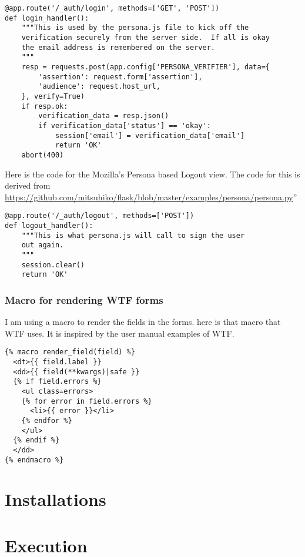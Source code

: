 \documentclass[11pt]{article}
\begin{document}
\begin{itemize}
\begin{verbatim}
@app.route('/_auth/login', methods=['GET', 'POST'])
def login_handler():
    """This is used by the persona.js file to kick off the
    verification securely from the server side.  If all is okay
    the email address is remembered on the server.
    """
    resp = requests.post(app.config['PERSONA_VERIFIER'], data={
        'assertion': request.form['assertion'],
        'audience': request.host_url,
    }, verify=True)
    if resp.ok:
        verification_data = resp.json()
        if verification_data['status'] == 'okay':
            session['email'] = verification_data['email']
            return 'OK'
    abort(400)
\end{verbatim}

Here is the code for the Mozilla's Persona based Logout view. The code
for this is derived from \href{https://github.com/mitsuhiko/flask/blob/master/examples/persona/persona.py}{https://github.com/mitsuhiko/flask/blob/master/examples/persona/persona.py}''

\begin{verbatim}
@app.route('/_auth/logout', methods=['POST'])
def logout_handler():
    """This is what persona.js will call to sign the user
    out again.
    """
    session.clear()
    return 'OK'
\end{verbatim}

\end{itemize} %
\subsubsection{Macro for rendering WTF forms}
\label{sec-4-3-4}

I am using a macro to render the fields in the forms. here is that
macro that WTF uses. It is inspired by the user manual examples of WTF.

\begin{verbatim}
{% macro render_field(field) %}
  <dt>{{ field.label }}
  <dd>{{ field(**kwargs)|safe }}
  {% if field.errors %}
    <ul class=errors>
    {% for error in field.errors %}
      <li>{{ error }}</li>
    {% endfor %}
    </ul>
  {% endif %}
  </dd>
{% endmacro %}
\end{verbatim}
\section{Installations}
\label{sec-5}
\section{Execution}
\label{sec-6}
\end{document}

